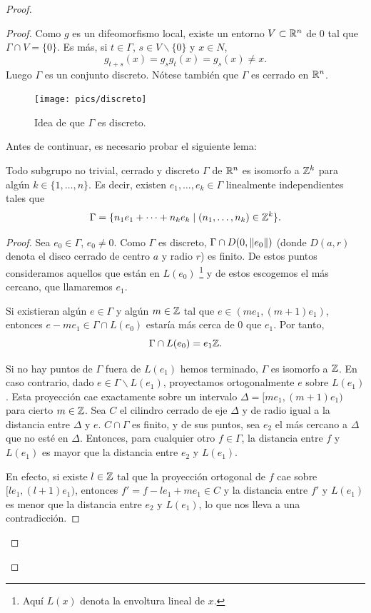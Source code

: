 \begin{proof}
\begin{proof}
 Como $g$ es un difeomorfismo local, existe un entorno $V\subset \mathbb{R}^n$ de 0 tal que $\Gamma\cap V= \{0\}$. Es más, si $t\in \Gamma$, $s\in V\backslash \{0\}$ y $x\in N$, 
  \[
    g_{t+s}(x)=g_sg_t(x)=g_s(x)\neq x.
  \]
  Luego $\Gamma$ es un conjunto discreto. Nótese también que $\Gamma$ es cerrado en $\mathbb{R}^n$.
  \begin{figure}[h]
    \centering
    \texttt{[image: pics/discreto]}
    \caption{\small Idea de que $\Gamma$ es discreto.}
    \label{fig:discreto}
  \end{figure}

  Antes de continuar, es necesario probar el siguiente lema:
  \begin{lema}\label{discreto}
    Todo subgrupo no trivial, cerrado y discreto $\Gamma$ de $\mathbb{R}^n$ es isomorfo a $\mathbb{Z}^k$ para algún $k\in\{1,\dots,n\}$. Es decir, existen $e_1,\dots,e_k \in \Gamma$ linealmente independientes tales que 
    \[
      \Gamma=\{n_1e_1+\cdots+n_ke_k \mid (n_1,\dots,n_k) \in \mathbb{Z}^k \}.
    \]
  \end{lema}
  \begin{proof}
  Sea $e_0 \in \Gamma$, $e_0 \neq 0$. Como $\Gamma$ es discreto, $\Gamma \cap D(0,\left\Vert e_0\right\Vert)$ (donde $D(a,r)$ denota el disco cerrado de centro $a$ y radio $r$) es finito. De estos puntos consideramos aquellos que están en $L(e_0)$ \footnote{Aquí $L(x)$ denota la envoltura lineal de $x$.} y de estos escogemos el más cercano, que llamaremos $e_1$. 
  
  Si existieran algún $e \in \Gamma$ y algún $m \in \mathbb{Z}$ tal que $e \in (me_1,(m+1)e_1)$, entonces $e-me_1 \in \Gamma \cap L(e_0)$ estaría más cerca de 0 que $e_1$. Por tanto, 
  \[
   \Gamma\cap L(e_0) = e_1\mathbb{Z}.
  \]

  Si no hay puntos de $\Gamma$ fuera de $L(e_1)$ hemos terminado, $\Gamma$ es isomorfo a $\mathbb{Z}$. En caso contrario, dado $e \in \Gamma \backslash L(e_1)$, proyectamos ortogonalmente $e$ sobre $L(e_1)$. Esta proyección cae exactamente sobre un intervalo $\Delta=[me_1,(m+1)e_1)$ para cierto $m \in \mathbb{Z}$. Sea $C$ el cilindro cerrado de eje $\Delta$ y de radio igual a la distancia entre $\Delta$ y $e$. $C\cap \Gamma$ es finito, y de sus puntos, sea $e_2$ el más cercano a $\Delta$ que no esté en $\Delta$. Entonces, para cualquier otro $f \in \Gamma$, la distancia entre $f$ y $L(e_1)$ es mayor que la distancia entre $e_2$ y $L(e_1)$. 
    
    En efecto, si existe $l \in \mathbb{Z}$ tal que la proyección ortogonal de $f$ cae sobre $[le_1,(l+1)e_1)$, entonces $f'=f-le_1+me_1 \in C$ y la distancia entre $f'$ y $L(e_1)$ es menor que la distancia entre $e_2$ y $L(e_1)$, lo que nos lleva a una contradicción.


\end{proof}
\end{proof}
\end{proof}
